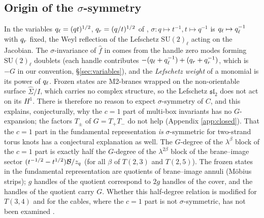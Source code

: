 \subsection{Origin of the \texorpdfstring{$\sigma$}{sigma}-symmetry}\label{sec:sigmaorigin}
In the variables $q_\ell = (qt)^{1/2}$, $q_r = (q/t)^{1/2}$ of \cite{KN17}, $\sigma\colon q\mapsto t^{-1}, t\mapsto q^{-1}$ is $q_\ell \mapsto q_\ell^{-1}$ with $q_r$ fixed, the Weyl reflection of the Lefschetz $\mathrm{SU}(2)_\ell$ acting on the Jacobian. The $\sigma$-invariance of $\hat f$ in \cite{KN17} comes from the handle zero modes forming $\mathrm{SU}(2)_\ell$ doublets (each handle contributes $-(q_\ell + q_\ell^{-1}) + (q_r + q_r^{-1})$, which is $-G$ in our convention, \S\ref{sec:variables}), and the \emph{Lefschetz weight} of a monomial is its power of $q_\ell$. Frozen states are M2-branes wrapped on the non-orientable surface $\hat\Sigma/I$, which carries no complex structure, so the Lefschetz $\mathfrak{sl}_2$ does not act on its $H^1$. There is therefore no reason to expect $\sigma$-symmetry of $C$, and this explains, conjecturally, why the $c = 1$ part of multi-box invariants has no $G$-expansion; the factors $T_\pm$ of $G = T_+T_-$ do not help (Appendix \ref{app:closed}).
That the $c = 1$ part in the fundamental representation \emph{is} $\sigma$-symmetric for two-strand torus knots has a conjectural explanation as well. The $G$-degree of the $\lambda^\beta$ block of the $c = 1$ part is exactly half the $G$-degree of the $\lambda^{2\beta}$ block of the brane--image sector $(t^{-1/2}-t^{1/2})\mathcal{B}/z_q$ (for all $\beta$ of $T(2,3)$ and $T(2,5)$). The frozen states in the fundamental representation are quotients of brane--image annuli (M\"obius strips); $g$ handles of the quotient correspond to $2g$ handles of the cover, and the handles of the quotient carry $G$. Whether this half-degree relation is modified for $T(3,4)$ and for the cables, where the $c = 1$ part is not $\sigma$-symmetric, has not been examined \open.

